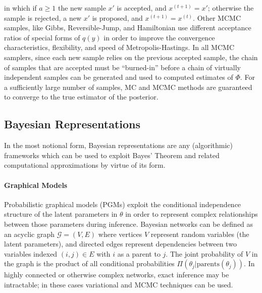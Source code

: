 \noindent in which if $a \geq 1$ the new sample $x'$ is accepted, and $x^{(t+1)} = x'$; otherwise the sample is rejected, a new $x'$ is proposed, and $x^{(t+1)} = x^{(t)}$. Other MCMC samples, like Gibbs\autocite{mackay1998introduction}, Reversible-Jump\autocite{green1995reversible}, and Hamiltonian\autocite{neal2011mcmc} use different acceptance ratios of special forms of $q(y)$ in order to improve the convergence characteristics, flexibility, and speed of Metropolis-Hastings.
In all MCMC samplers, since each new sample relies on the previous accepted sample, the chain of samples that are accepted must be ``burned-in'' before a chain of virtually independent samples can be generated and used to computed estimates of $\Phi$. For a sufficiently large number of samples, MC and MCMC methods are guaranteed to converge to the true estimator of the posterior\autocite{mackay1998introduction}.


\subsection{Bayesian Representations}
In the most notional form, Bayesian representations are any (algorithmic) frameworks which can be used to exploit Bayes' Theorem and related computational approximations by virtue of its form.

\paragraph{Graphical Models}
Probabilistic graphical models (PGMs) exploit the conditional independence structure of the latent parameters in $\theta$ in order to represent complex relationships between those parameters during inference. Bayesian networks\autocite{ghahramani2001introduction,aguilera2011bayesian,Arora2017} can be defined as an acyclic graph $\mathcal{G} = (V, E)$ where vertices $V$ represent random variables (the latent parameters), and directed edges represent dependencies between two variables indexed $(i, j) \in E$ with $i$ as a parent to $j$. The joint probability of $V$ in the graph is the product of all conditional probabilities $\Pi(\theta_j | \text{parents}(\theta_j))$. In highly connected or otherwise complex networks, exact inference may be intractable; in these cases variational and MCMC techniques can be used. 

